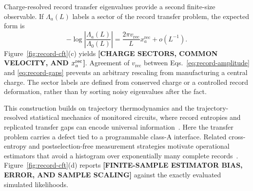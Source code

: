 \documentclass[aps,prx,twocolumn,superscriptaddress,longbibliography,nofootinbib,floatfix]{revtex4-2}
\newcommand{\ResultPlaceholder}[1]{\ignorespaces}
\newcommand{\ResultValue}[1]{\textcolor{BrickRed}{\textbf{[#1]}}}
\begin{document}
Charge-resolved record transfer eigenvalues provide a second finite-size observable.  If $\Lambda_a(L)$ labels a sector of the record transfer problem, the expected form is
\begin{equation}
 -\log\left|\frac{\Lambda_a(L)}{\Lambda_0(L)}\right|
 =\frac{2\pi v_{\mathrm{rec}}}{L}x_a^{\mathrm{rec}}+o(L^{-1}).
 \label{eq:record-gaps}
\end{equation}
Figure~\ref{fig:record-cft}(c) yields \ResultValue{CHARGE SECTORS, COMMON VELOCITY, AND $x_a^{\rm rec}$}.  Agreement of $v_{\mathrm{rec}}$ between Eqs.~\eqref{eq:record-amplitude} and \eqref{eq:record-gaps} prevents an arbitrary rescaling from manufacturing a central charge.  The sector labels are defined from conserved charge or a controlled record deformation, rather than by sorting noisy eigenvalues after the fact.

This construction builds on trajectory thermodynamics and the trajectory-resolved statistical mechanics of monitored circuits, where record entropies and replicated transfer gaps can encode universal information~\cite{GarrahanLesanovsky2010,JianYouVasseur2020,BaoChoiAltman2020,Zabalo2022}.  Here the transfer problem carries a defect tied to a programmable class-A interface.  Related cross-entropy and postselection-free measurement strategies motivate operational estimators that avoid a histogram over exponentially many complete records~\cite{LiZou2023,GarrattAltman2024}.  Figure~\ref{fig:record-cft}(d) reports \ResultValue{FINITE-SAMPLE ESTIMATOR BIAS, ERROR, AND SAMPLE SCALING} against the exactly evaluated simulated likelihoods.  \ResultPlaceholder{The operational record-only claim is accepted only after the replica mapping and finite-sample estimator are both numerically validated; direct access to simulated $p_\xi$ alone is insufficient.}
\end{document}
